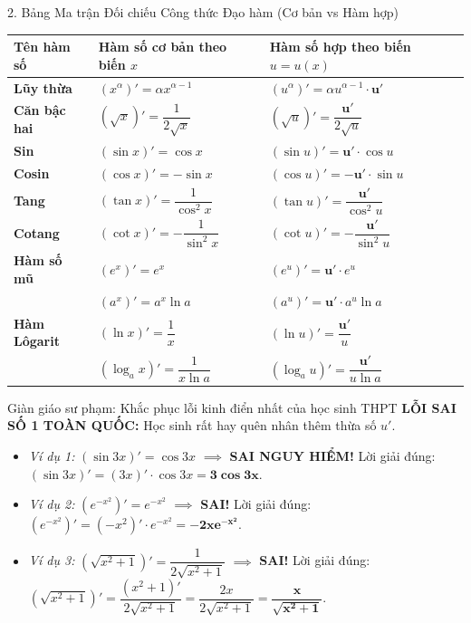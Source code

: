 \documentclass[12pt, a4paper]{article}
\begin{document}
\begin{pedabox}{2. Bảng Ma trận Đối chiếu Công thức Đạo hàm (Cơ bản vs Hàm hợp)}
\begin{center}
\small
\begin{tabularx}{\linewidth}{|l|X|X|}
\hline
\textbf{Tên hàm số} & \textbf{Hàm số cơ bản theo biến $x$} & \textbf{Hàm số hợp theo biến $u = u(x)$} \\ \hline
\textbf{Lũy thừa} & $(x^\alpha)' = \alpha x^{\alpha - 1}$ & $(u^\alpha)' = \alpha u^{\alpha - 1} \cdot \mathbf{u'}$ \\ \hline
\textbf{Căn bậc hai} & $(\sqrt{x})' = \dfrac{1}{2\sqrt{x}}$ & $(\sqrt{u})' = \dfrac{\mathbf{u'}}{2\sqrt{u}}$ \\ \hline
\textbf{Sin} & $(\sin x)' = \cos x$ & $(\sin u)' = \mathbf{u'} \cdot \cos u$ \\ \hline
\textbf{Cosin} & $(\cos x)' = -\sin x$ & $(\cos u)' = -\mathbf{u'} \cdot \sin u$ \\ \hline
\textbf{Tang} & $(\tan x)' = \dfrac{1}{\cos^2 x}$ & $(\tan u)' = \dfrac{\mathbf{u'}}{\cos^2 u}$ \\ \hline
\textbf{Cotang} & $(\cot x)' = -\dfrac{1}{\sin^2 x}$ & $(\cot u)' = -\dfrac{\mathbf{u'}}{\sin^2 u}$ \\ \hline
\textbf{Hàm số mũ} & $(e^x)' = e^x$ & $(e^u)' = \mathbf{u'} \cdot e^u$ \\ 
& $(a^x)' = a^x \ln a$ & $(a^u)' = \mathbf{u'} \cdot a^u \ln a$ \\ \hline
\textbf{Hàm Lôgarit} & $(\ln x)' = \dfrac{1}{x}$ & $(\ln u)' = \dfrac{\mathbf{u'}}{u}$ \\ 
& $(\log_a x)' = \dfrac{1}{x \ln a}$ & $(\log_a u)' = \dfrac{\mathbf{u'}}{u \ln a}$ \\ \hline
\end{tabularx}
\end{center}
\end{pedabox}

\begin{scaffoldbox}{Giàn giáo sư phạm: Khắc phục lỗi kinh điển nhất của học sinh THPT}
\textbf{LỖI SAI SỐ 1 TOÀN QUỐC:} Học sinh rất hay quên nhân thêm thừa số $u'$.
\begin{itemize}[leftmargin=0.5cm]
    \item \textit{Ví dụ 1:} $(\sin 3x)' = \cos 3x$ $\implies$ \textbf{SAI NGUY HIỂM!}
    Lời giải đúng: $(\sin 3x)' = (3x)' \cdot \cos 3x = \mathbf{3\cos 3x}$.
    \item \textit{Ví dụ 2:} $(e^{-x^2})' = e^{-x^2}$ $\implies$ \textbf{SAI!}
    Lời giải đúng: $(e^{-x^2})' = (-x^2)' \cdot e^{-x^2} = \mathbf{-2x e^{-x^2}}$.
    \item \textit{Ví dụ 3:} $(\sqrt{x^2 + 1})' = \dfrac{1}{2\sqrt{x^2 + 1}}$ $\implies$ \textbf{SAI!}
    Lời giải đúng: $(\sqrt{x^2 + 1})' = \dfrac{(x^2 + 1)'}{2\sqrt{x^2 + 1}} = \dfrac{2x}{2\sqrt{x^2 + 1}} = \mathbf{\dfrac{x}{\sqrt{x^2 + 1}}}$.
\end{itemize}
\end{scaffoldbox}
\end{document}
